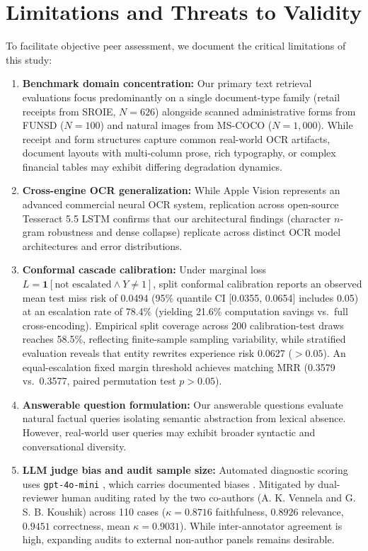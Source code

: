 \documentclass[conference]{IEEEtran}
\begin{document}
\section{Limitations and Threats to Validity}
\label{sec:limitations}
To facilitate objective peer assessment, we document the critical limitations of this study:
\begin{enumerate}
    \setlength{\itemsep}{0.2pt plus 0.1pt}
    \setlength{\parsep}{0pt}
    \setlength{\parskip}{0pt}
    \item \textbf{Benchmark domain concentration:} Our primary text retrieval evaluations focus predominantly on a single document-type family (retail receipts from SROIE, $N=626$) alongside scanned administrative forms from FUNSD ($N=100$) and natural images from MS-COCO ($N=1{,}000$). While receipt and form structures capture common real-world OCR artifacts, document layouts with multi-column prose, rich typography, or complex financial tables may exhibit differing degradation dynamics.
    \item \textbf{Cross-engine OCR generalization:} While Apple Vision represents an advanced commercial neural OCR system, replication across open-source Tesseract 5.5 LSTM confirms that our architectural findings (character $n$-gram robustness and dense collapse) replicate across distinct OCR model architectures and error distributions.
    \item \textbf{Conformal cascade calibration:} Under marginal loss $L = \mathbf{1}[\text{not escalated} \land Y \ne 1]$, split conformal calibration reports an observed mean test miss risk of 0.0494 (95\% quantile CI [0.0355, 0.0654] includes 0.05) at an escalation rate of 78.4\% (yielding 21.6\% computation savings vs.\ full cross-encoding). Empirical split coverage across 200 calibration-test draws reaches 58.5\%, reflecting finite-sample sampling variability, while stratified evaluation reveals that entity rewrites experience risk 0.0627 ($> 0.05$). An equal-escalation fixed margin threshold achieves matching MRR (0.3579 vs.\ 0.3577, paired permutation test $p > 0.05$).
    \item \textbf{Answerable question formulation:} Our answerable questions evaluate natural factual queries isolating semantic abstraction from lexical absence. However, real-world user queries may exhibit broader syntactic and conversational diversity.
    \item \textbf{LLM judge bias and audit sample size:} Automated diagnostic scoring uses \texttt{gpt-4o-mini} \cite{openai2024gpt4o}, which carries documented biases \cite{zheng2023judging}. Mitigated by dual-reviewer human auditing rated by the two co-authors (A. K. Vennela and G. S. B. Koushik) across 110 cases ($\kappa = 0.8716$ faithfulness, $0.8926$ relevance, $0.9451$ correctness, mean $\kappa = 0.9031$). While inter-annotator agreement is high, expanding audits to external non-author panels remains desirable.

\end{enumerate}
\end{document}
